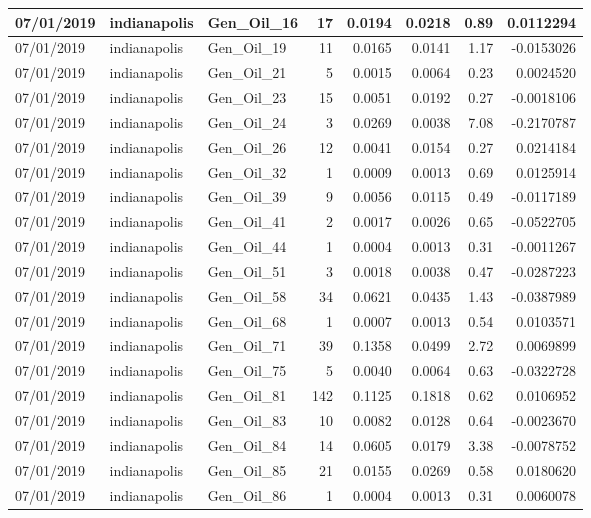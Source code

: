 \documentclass[
  letterpaper,
  DIV=11,
  numbers=noendperiod]{scrartcl}
\begin{document}
\begin{tabular}{l|l|l|r|r|r|r|r}
\hline
07/01/2019 & indianapolis & Gen\_Oil\_16 & 17 & 0.0194 & 0.0218 & 0.89 & 0.0112294\\
\hline
07/01/2019 & indianapolis & Gen\_Oil\_19 & 11 & 0.0165 & 0.0141 & 1.17 & -0.0153026\\
\hline
07/01/2019 & indianapolis & Gen\_Oil\_21 & 5 & 0.0015 & 0.0064 & 0.23 & 0.0024520\\
\hline
07/01/2019 & indianapolis & Gen\_Oil\_23 & 15 & 0.0051 & 0.0192 & 0.27 & -0.0018106\\
\hline
07/01/2019 & indianapolis & Gen\_Oil\_24 & 3 & 0.0269 & 0.0038 & 7.08 & -0.2170787\\
\hline
07/01/2019 & indianapolis & Gen\_Oil\_26 & 12 & 0.0041 & 0.0154 & 0.27 & 0.0214184\\
\hline
07/01/2019 & indianapolis & Gen\_Oil\_32 & 1 & 0.0009 & 0.0013 & 0.69 & 0.0125914\\
\hline
07/01/2019 & indianapolis & Gen\_Oil\_39 & 9 & 0.0056 & 0.0115 & 0.49 & -0.0117189\\
\hline
07/01/2019 & indianapolis & Gen\_Oil\_41 & 2 & 0.0017 & 0.0026 & 0.65 & -0.0522705\\
\hline
07/01/2019 & indianapolis & Gen\_Oil\_44 & 1 & 0.0004 & 0.0013 & 0.31 & -0.0011267\\
\hline
07/01/2019 & indianapolis & Gen\_Oil\_51 & 3 & 0.0018 & 0.0038 & 0.47 & -0.0287223\\
\hline
07/01/2019 & indianapolis & Gen\_Oil\_58 & 34 & 0.0621 & 0.0435 & 1.43 & -0.0387989\\
\hline
07/01/2019 & indianapolis & Gen\_Oil\_68 & 1 & 0.0007 & 0.0013 & 0.54 & 0.0103571\\
\hline
07/01/2019 & indianapolis & Gen\_Oil\_71 & 39 & 0.1358 & 0.0499 & 2.72 & 0.0069899\\
\hline
07/01/2019 & indianapolis & Gen\_Oil\_75 & 5 & 0.0040 & 0.0064 & 0.63 & -0.0322728\\
\hline
07/01/2019 & indianapolis & Gen\_Oil\_81 & 142 & 0.1125 & 0.1818 & 0.62 & 0.0106952\\
\hline
07/01/2019 & indianapolis & Gen\_Oil\_83 & 10 & 0.0082 & 0.0128 & 0.64 & -0.0023670\\
\hline
07/01/2019 & indianapolis & Gen\_Oil\_84 & 14 & 0.0605 & 0.0179 & 3.38 & -0.0078752\\
\hline
07/01/2019 & indianapolis & Gen\_Oil\_85 & 21 & 0.0155 & 0.0269 & 0.58 & 0.0180620\\
\hline
07/01/2019 & indianapolis & Gen\_Oil\_86 & 1 & 0.0004 & 0.0013 & 0.31 & 0.0060078\\

\end{tabular}
\end{document}
